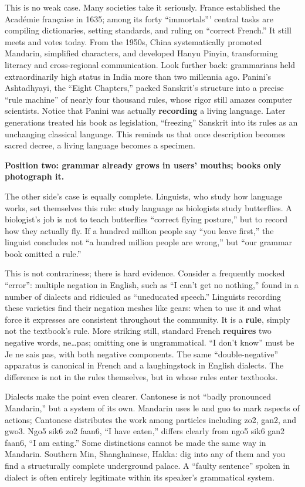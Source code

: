 This is no weak case. Many societies take it seriously. France established the Académie française in 1635; among its forty ``immortals''' central tasks are compiling dictionaries, setting standards, and ruling on ``correct French.'' It still meets and votes today. From the 1950s, China systematically promoted Mandarin, simplified characters, and developed Hanyu Pinyin, transforming literacy and cross-regional communication. Look further back: grammarians held extraordinarily high status in India more than two millennia ago. Panini's Ashtadhyayi, the ``Eight Chapters,'' packed Sanskrit's structure into a precise ``rule machine'' of nearly four thousand rules, whose rigor still amazes computer scientists. Notice that Panini was actually \textbf{recording} a living language. Later generations treated his book as legislation, ``freezing'' Sanskrit into its rules as an unchanging classical language. This reminds us that once description becomes sacred decree, a living language becomes a specimen.

\textbf{Position two: grammar already grows in users' mouths; books only photograph it.}

The other side's case is equally complete. Linguists, who study how language works, set themselves this rule: study language as biologists study butterflies. A biologist's job is not to teach butterflies ``correct flying posture,'' but to record how they actually fly. If a hundred million people say ``you leave first,'' the linguist concludes not ``a hundred million people are wrong,'' but ``our grammar book omitted a rule.''

This is not contrariness; there is hard evidence. Consider a frequently mocked ``error'': multiple negation in English, such as ``I can't get no nothing,'' found in a number of dialects and ridiculed as ``uneducated speech.'' Linguists recording these varieties find their negation meshes like gears: when to use it and what force it expresses are consistent throughout the community. It is a \textbf{rule}, simply not the textbook's rule. More striking still, standard French \textbf{requires} two negative words, ne\ldots{}pas; omitting one is ungrammatical. ``I don't know'' must be Je ne sais pas, with both negative components. The same ``double-negative'' apparatus is canonical in French and a laughingstock in English dialects. The difference is not in the rules themselves, but in whose rules enter textbooks.

Dialects make the point even clearer. Cantonese is not ``badly pronounced Mandarin,'' but a system of its own. Mandarin uses le and guo to mark aspects of actions; Cantonese distributes the work among particles including zo2, gan2, and gwo3. Ngo5 sik6 zo2 faan6, ``I have eaten,'' differs clearly from ngo5 sik6 gan2 faan6, ``I am eating.'' Some distinctions cannot be made the same way in Mandarin. Southern Min, Shanghainese, Hakka: dig into any of them and you find a structurally complete underground palace. A ``faulty sentence'' spoken in dialect is often entirely legitimate within its speaker's grammatical system.

